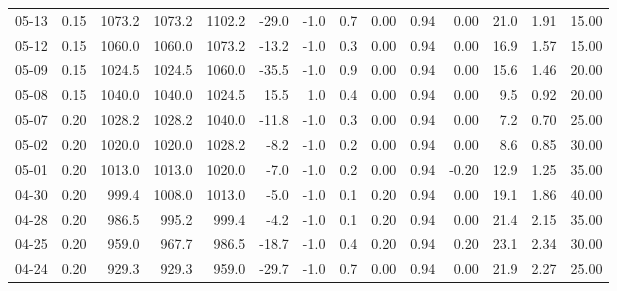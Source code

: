 \begin{threeparttable}
{\begin{tabular}{lrrrrrrrrrrrrr}
  05-13 &     0.15 & 1073.2 & 1073.2 & 1102.2 &      -29.0 &                     -1.0 &                 0.7 &       0.00 &      0.94 &           0.00 &             21.0 &            1.91 &                  15.00 \\
  05-12 &     0.15 & 1060.0 & 1060.0 & 1073.2 &      -13.2 &                     -1.0 &                 0.3 &       0.00 &      0.94 &           0.00 &             16.9 &            1.57 &                  15.00 \\
  05-09 &     0.15 & 1024.5 & 1024.5 & 1060.0 &      -35.5 &                     -1.0 &                 0.9 &       0.00 &      0.94 &           0.00 &             15.6 &            1.46 &                  20.00 \\
  05-08 &     0.15 & 1040.0 & 1040.0 & 1024.5 &       15.5 &                      1.0 &                 0.4 &       0.00 &      0.94 &           0.00 &              9.5 &            0.92 &                  20.00 \\
  05-07 &     0.20 & 1028.2 & 1028.2 & 1040.0 &      -11.8 &                     -1.0 &                 0.3 &       0.00 &      0.94 &           0.00 &              7.2 &            0.70 &                  25.00 \\
  05-02 &     0.20 & 1020.0 & 1020.0 & 1028.2 &       -8.2 &                     -1.0 &                 0.2 &       0.00 &      0.94 &           0.00 &              8.6 &            0.85 &                  30.00 \\
  05-01 &     0.20 & 1013.0 & 1013.0 & 1020.0 &       -7.0 &                     -1.0 &                 0.2 &       0.00 &      0.94 &          -0.20 &             12.9 &            1.25 &                  35.00 \\
  04-30 &     0.20 &  999.4 & 1008.0 & 1013.0 &       -5.0 &                     -1.0 &                 0.1 &       0.20 &      0.94 &           0.00 &             19.1 &            1.86 &                  40.00 \\
  04-28 &     0.20 &  986.5 &  995.2 &  999.4 &       -4.2 &                     -1.0 &                 0.1 &       0.20 &      0.94 &           0.00 &             21.4 &            2.15 &                  35.00 \\
  04-25 &     0.20 &  959.0 &  967.7 &  986.5 &      -18.7 &                     -1.0 &                 0.4 &       0.20 &      0.94 &           0.20 &             23.1 &            2.34 &                  30.00 \\
  04-24 &     0.20 &  929.3 &  929.3 &  959.0 &      -29.7 &                     -1.0 &                 0.7 &       0.00 &      0.94 &           0.00 &             21.9 &            2.27 &                  25.00 \\

\end{tabular}}
\end{threeparttable}
